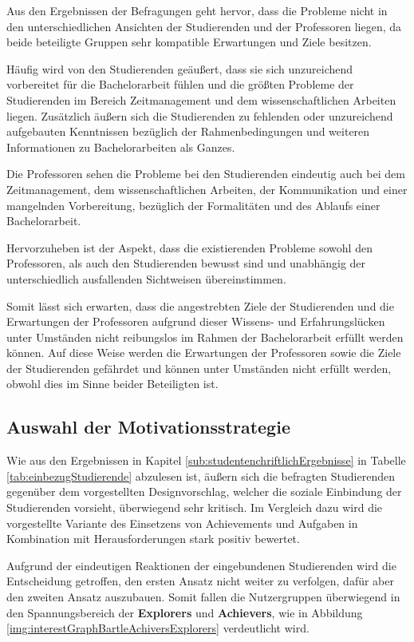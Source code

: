 \documentclass[bibliography=totoc,listof=totoc,BCOR=5mm,DIV=12,oneside]{scrbook}
\begin{document}
\par \bigskip Aus den Ergebnissen der Befragungen geht hervor, dass die Probleme nicht in den unterschiedlichen Ansichten der Studierenden und der Professoren liegen, da beide beteiligte Gruppen sehr kompatible Erwartungen und Ziele besitzen.

\par\medskip Häufig wird von den Studierenden geäußert, dass sie sich unzureichend vorbereitet für die Bachelorarbeit fühlen und die größten Probleme der Studierenden im Bereich Zeitmanagement und dem wissenschaftlichen Arbeiten liegen. Zusätzlich äußern sich die Studierenden zu fehlenden oder unzureichend aufgebauten Kenntnissen bezüglich der Rahmenbedingungen und weiteren Informationen zu Bachelorarbeiten als Ganzes.

\par\medskip Die Professoren sehen die Probleme bei den Studierenden eindeutig auch bei dem Zeitmanagement, dem wissenschaftlichen Arbeiten, der Kommunikation und einer mangelnden Vorbereitung, bezüglich der Formalitäten und des Ablaufs einer Bachelorarbeit.

\par\medskip Hervorzuheben ist der Aspekt, dass die existierenden Probleme sowohl den Professoren, als auch den Studierenden bewusst sind und unabhängig der unterschiedlich ausfallenden Sichtweisen übereinstimmen.

\par\medskip Somit lässt sich erwarten, dass die angestrebten Ziele der Studierenden und die Erwartungen der Professoren aufgrund dieser Wissens- und Erfahrungslücken unter Umständen nicht reibungslos im Rahmen der Bachelorarbeit erfüllt werden können. Auf diese Weise werden die Erwartungen der Professoren sowie die Ziele der Studierenden gefährdet und können unter Umständen nicht erfüllt werden, obwohl dies im Sinne beider Beteiligten ist.

\subsection{Auswahl der Motivationsstrategie}
\par Wie aus den Ergebnissen in Kapitel \ref{sub:studentenchriftlichErgebnisse} in Tabelle \ref{tab:einbezugStudierende} abzulesen ist, äußern sich die befragten Studierenden gegenüber dem vorgestellten Designvorschlag, welcher die soziale Einbindung der Studierenden vorsieht, überwiegend sehr kritisch. Im Vergleich dazu wird die vorgestellte Variante des Einsetzens von Achievements und Aufgaben in Kombination mit Herausforderungen stark positiv bewertet.
\par Aufgrund der eindeutigen Reaktionen der eingebundenen Studierenden wird die Entscheidung getroffen, den ersten Ansatz nicht weiter zu verfolgen, dafür aber den zweiten Ansatz auszubauen. Somit fallen die Nutzergruppen überwiegend in den Spannungsbereich der \textbf{Explorers} und \textbf{Achievers}, wie in Abbildung \ref{img:interestGraphBartleAchiversExplorers} verdeutlicht wird. 
\end{document}
